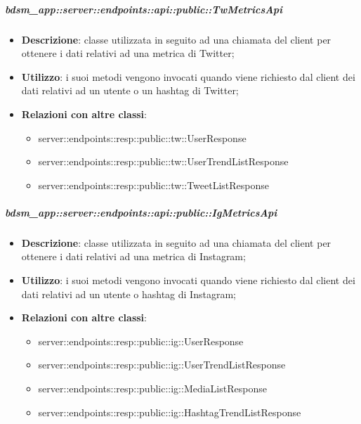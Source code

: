     \subparagraph{bdsm\_app::server::endpoints::api::public::TwMetricsApi} %
    \label{subp:bdsm_app_server_endpoints_api_public_twmetricsapi}
    \begin{itemize}
      \item \textbf{Descrizione}: classe utilizzata in seguito ad una chiamata del client per ottenere i dati relativi ad una metrica di Twitter;
      \item \textbf{Utilizzo}: i suoi metodi vengono invocati quando viene richiesto dal client dei dati relativi ad un utente o un hashtag di Twitter;
      \item \textbf{Relazioni con altre classi}:
        \begin{itemize}
          \item server::endpoints::resp::public::tw::UserResponse
          \item server::endpoints::resp::public::tw::UserTrendListResponse
          \item server::endpoints::resp::public::tw::TweetListResponse
        \end{itemize}
      \end{itemize}

    \subparagraph{bdsm\_app::server::endpoints::api::public::IgMetricsApi} %
    \label{subp:bdsm_app_server_endpoints_api_public_igmetricsapi}
    \begin{itemize}
      \item \textbf{Descrizione}: classe utilizzata in seguito ad una chiamata del client per ottenere i dati relativi ad una metrica di Instagram;
      \item \textbf{Utilizzo}: i suoi metodi vengono invocati quando viene richiesto dal client dei dati relativi ad un utente o hashtag di Instagram;
      \item \textbf{Relazioni con altre classi}:
        \begin{itemize}
          \item server::endpoints::resp::public::ig::UserResponse
          \item server::endpoints::resp::public::ig::UserTrendListResponse
          \item server::endpoints::resp::public::ig::MediaListResponse
          \item server::endpoints::resp::public::ig::HashtagTrendListResponse
        \end{itemize}
      \end{itemize}

